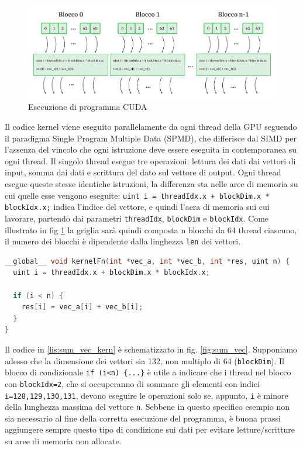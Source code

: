 \begin{figure}[ht]
    \centering
    \includegraphics[width=.9\linewidth]{images/chapter2/grid.png}
    \caption{Esecuzione di programma CUDA}
    \label{fig:grid}
\end{figure}


Il codice kernel viene eseguito parallelamente da ogni thread della GPU seguendo il paradigma Single Program Multiple Data (SPMD), che differisce dal SIMD per l'assenza del vincolo che ogni istruzione deve essere eseguita in contemporanea su ogni thread. Il singolo thread esegue tre operazioni: lettura dei dati dai vettori di input, somma dai dati e scrittura del dato sul vettore di output. Ogni thread esegue queste stesse identiche istruzioni, la differenza sta nelle aree di memoria su cui quelle esse vengono eseguite: \verb|uint i = threadIdx.x + blockDim.x * blockIdx.x;| indica l'indice del vettore, e quindi l'aera di memoria sui cui lavorare, partendo dai parametri \verb|threadIdx|, \verb|blockDim| e \verb|blockIdx|. Come illustrato in fig \ref{fig:grid} la griglia sarà quindi composta n blocchi da 64 thread ciascuno, il numero dei blocchi è dipendente dalla linghezza \verb|len| dei vettori.

\begin{lstlisting}[language=C++, caption=Kernel CUDA di somma di vettori, label=lis:sum_vec_kern]
__global__ void kernelFn(int *vec_a, int *vec_b, int *res, uint n) {
  uint i = threadIdx.x + blockDim.x * blockIdx.x;

  if (i < n) {
    res[i] = vec_a[i] + vec_b[i];
  }
}\end{lstlisting}

Il codice in \ref{lis:sum_vec_kern} è schematizzato in fig. \ref{fig:sum_vec}. Supponiamo adesso che la dimensione dei vettori sia 132, non multiplo di 64 (\verb|blockDim|). Il blocco di condizionale \verb|if (i<n) {...}| è utile a indicare che i thread nel blocco con \verb|blockIdx=2|, che si occuperanno di sommare gli elementi con indici \verb|i=128,129,130,131|, devono eseguire le operazioni solo se, appunto, \verb|i| è minore della lunghezza massima del vettore \verb|n|. Sebbene in questo specifico esempio non sia necessario al fine della corretta esecuzione del programma, è buona prassi aggiungere sempre questo tipo di condizione sui dati per evitare letture/scritture su aree di memoria non allocate.


